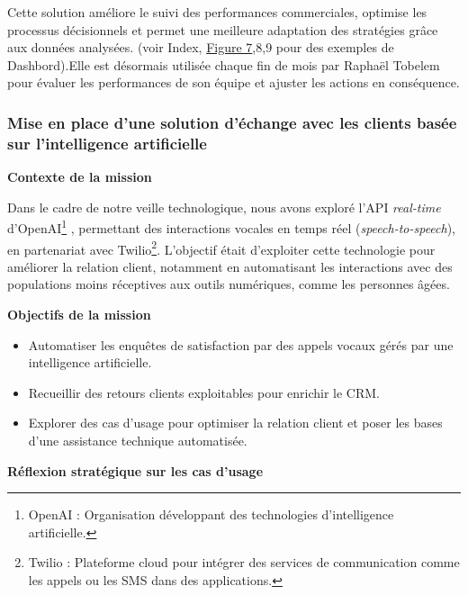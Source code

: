 Cette solution améliore le suivi des performances commerciales, optimise les processus décisionnels et permet une meilleure adaptation des stratégies grâce aux données analysées. (voir Index, \hyperref[fig:analyse-telepros]{Figure 7},8,9 pour des exemples de Dashbord).Elle est désormais utilisée chaque fin de mois par Raphaël Tobelem pour évaluer les performances de son équipe et ajuster les actions en conséquence.

\subsubsection{Mise en place d’une solution d’échange avec les clients basée sur l’intelligence artificielle}

\textbf{Contexte de la mission}\vspace{0.3cm}

Dans le cadre de notre veille technologique, nous avons exploré l’API \textit{real-time} d’OpenAI\footnote{OpenAI : Organisation développant des technologies d’intelligence artificielle.}
, permettant des interactions vocales en temps réel (\textit{speech-to-speech}), en partenariat avec Twilio\footnote{Twilio : Plateforme cloud pour intégrer des services de communication comme les appels ou les SMS dans des applications.}. L’objectif était d’exploiter cette technologie pour améliorer la relation client, notamment en automatisant les interactions avec des populations moins réceptives aux outils numériques, comme les personnes âgées.\vspace{0.3cm}

\textbf{Objectifs de la mission}\vspace{0.3cm}

\begin{itemize}
    \item Automatiser les enquêtes de satisfaction par des appels vocaux gérés par une intelligence artificielle.\vspace{0.3cm}
    \item Recueillir des retours clients exploitables pour enrichir le CRM.\vspace{0.3cm}
    \item Explorer des cas d’usage pour optimiser la relation client et poser les bases d’une assistance technique automatisée.\vspace{0.3cm}
\end{itemize}

\textbf{Réflexion stratégique sur les cas d’usage}\vspace{0.3cm}

